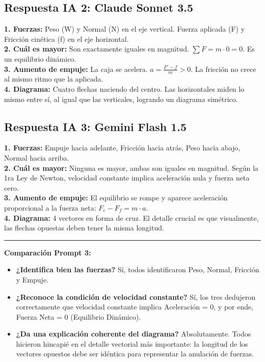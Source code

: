\documentclass[11pt]{article}
\begin{document}
\subsection*{Respuesta IA 2: Claude Sonnet 3.5}
\textbf{1. Fuerzas:} Peso (W) y Normal (N) en el eje vertical. Fuerza aplicada (F) y Fricción cinética (f) en el eje horizontal. \\
\textbf{2. Cuál es mayor:} Son exactamente iguales en magnitud. $\sum F = m \cdot 0 = 0$. Es un equilibrio dinámico. \\
\textbf{3. Aumento de empuje:} La caja se acelera. $a = \frac{F' - f}{m} > 0$. La fricción no crece al mismo ritmo que la aplicada. \\
\textbf{4. Diagrama:} Cuatro flechas naciendo del centro. Las horizontales miden lo mismo entre sí, al igual que las verticales, logrando un diagrama simétrico.

\subsection*{Respuesta IA 3: Gemini Flash 1.5}
\textbf{1. Fuerzas:} Empuje hacia adelante, Fricción hacia atrás, Peso hacia abajo, Normal hacia arriba. \\
\textbf{2. Cuál es mayor:} Ninguna es mayor, ambas son iguales en magnitud. Según la 1ra Ley de Newton, velocidad constante implica aceleración nula y fuerza neta cero. \\
\textbf{3. Aumento de empuje:} El equilibrio se rompe y aparece aceleración proporcional a la fuerza neta: $F_e - F_f = m \cdot a$. \\
\textbf{4. Diagrama:} 4 vectores en forma de cruz. El detalle crucial es que visualmente, las flechas opuestas deben tener la misma longitud.

\vspace{0.5cm}
\hrule
\vspace{0.3cm}
\textbf{Comparación Prompt 3:}
\begin{itemize}
	\item \textbf{¿Identifica bien las fuerzas?} Sí, todos identificaron Peso, Normal, Fricción y Empuje.
	\item \textbf{¿Reconoce la condición de velocidad constante?} Sí, los tres dedujeron correctamente que velocidad constante implica Aceleración = 0, y por ende, Fuerza Neta = 0 (Equilibrio Dinámico).
	\item \textbf{¿Da una explicación coherente del diagrama?} Absolutamente. Todos hicieron hincapié en el detalle vectorial más importante: la longitud de los vectores opuestos debe ser idéntica para representar la anulación de fuerzas.
\end{itemize}
\end{document}
